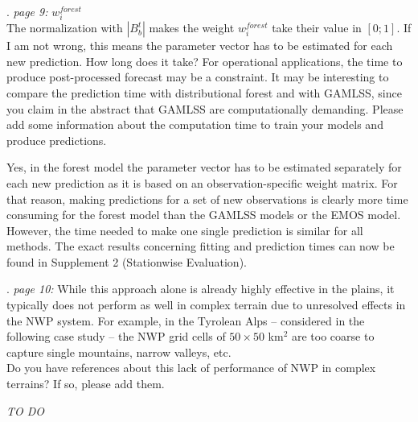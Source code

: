 \documentclass[american,foldmarks=false,noconfig]{uibklttr}
\newenvironment{review}{\fontshape{\itdefault}\fontseries{\bfdefault} \selectfont \smallskip}{\par}
\begin{document}
\begin{review}
10. {\color{quotecolor}\textit{page 9:} $w_i^{forest}$}\\
The normalization with $|B_b^t|$ makes the weight $w_i^{forest}$ 
take their value in $[0; 1]$. If I am not wrong, this means the 
parameter vector has to be estimated for each new prediction. 
How long does it take? For operational applications, the time 
to produce post-processed forecast may be a constraint. It may 
be interesting to compare the prediction time with distributional 
forest and with GAMLSS, since you claim in the abstract that
GAMLSS are computationally demanding. Please add some information
about the computation time to train your models and produce predictions.
\end{review}

Yes, in the forest model the parameter vector has to be estimated 
separately for each new prediction as it is based on an 
observation-specific weight matrix. For that reason, making 
predictions for a set of new observations is clearly more 
time consuming for the forest model than the GAMLSS models 
or the EMOS model. However, the time needed to make one single 
prediction is similar for all methods. The exact results 
concerning fitting and prediction times can now be found in
Supplement 2 (Stationwise Evaluation).


\begin{review}
11. {\color{quotecolor}\textit{page 10:} While this approach 
alone is already highly effective in the plains, it typically 
does not perform as well in complex terrain due to unresolved 
effects in the NWP system. For example, in the Tyrolean 
Alps -- considered in the following case study -- the NWP grid 
cells of $50 \times 50$ km$^2$ are too coarse to capture single 
mountains, narrow valleys, etc.}\\
Do you have references about this lack of performance of NWP 
in complex terrains? If so, please add them.
\end{review}

\textit{TO DO}
\end{document}
